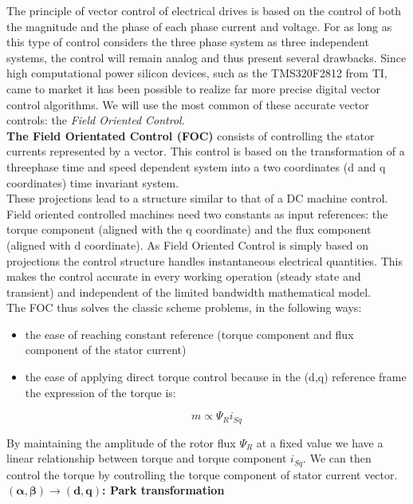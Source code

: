 \documentclass[12pt]{article}
\begin{document}
The principle of vector control of electrical drives is based on the control of both the magnitude and the phase of each phase current and voltage. For as long as this type of control considers the three phase system as three independent systems, the control will remain analog and thus present several drawbacks. Since high computational power silicon devices, such as the TMS320F2812 from TI, came to market it has been possible to realize far more precise digital vector control algorithms. We will use the most common of these accurate vector controls: the \textit{Field Oriented Control}.\\
\textbf{The Field Orientated Control (FOC)} consists of controlling the stator currents represented by a vector. This control is based on the transformation of a threephase
time and speed dependent system into a two coordinates (d and q coordinates) time invariant system.\\ 
These projections lead to a structure similar to that of a DC
machine control. Field oriented controlled machines need two constants as input references: the torque component (aligned with the q coordinate) and the flux component (aligned with d coordinate). As Field Oriented Control is simply based on
projections the control structure handles instantaneous electrical quantities. This makes the control accurate in every working operation (steady state and transient) and independent of the limited bandwidth mathematical model.\\ The FOC thus solves the classic scheme problems, in the following ways:
\begin{itemize}
\item  the ease of reaching constant reference (torque component and flux component of the
stator current)
\item the ease of applying direct torque control because in the (d,q) reference frame the
expression of the torque is:
\begin{center}
$$m\propto\Psi_{R}i_{Sq}$$
\end{center}
\end{itemize}
By maintaining the amplitude of the rotor flux $\Psi_{R}$ at a fixed value we have a linear relationship between torque and torque component $i_{Sq}$. We can then control the torque
by controlling the torque component of stator current vector.\\

\textbf{$\boldsymbol{(\alpha,\beta)\rightarrow (d,q)}$: Park transformation}\\
\end{document}
